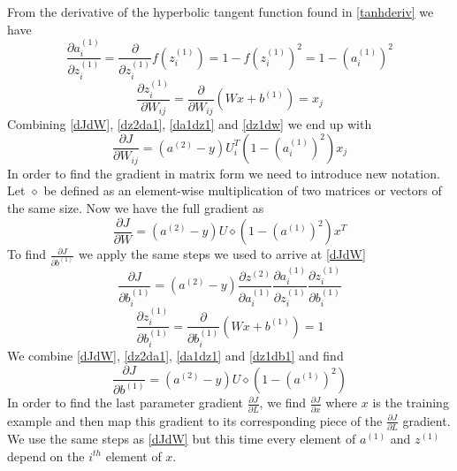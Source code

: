 \documentclass{article}
\begin{document}
From the derivative of the hyperbolic tangent function found in \eqref{tanhderiv} we have
\begin{equation}\label{da1dz1}
\frac{\partial a_{i}^{(1)}}{\partial z_{i}^{(1)}} = \frac{\partial}{\partial z_{i}^{(1)}}f(z_i^{(1)})  = 1-f(z_i^{(1)})^2 = 1-(a_i^{(1)})^2
\end{equation}
\begin{equation}\label{dz1dw}
\frac{\partial z_{i}^{(1)}}{\partial W_{ij}} = \frac{\partial}{\partial W_{ij}} \left( Wx+b^{(1)} \right) = x_j
\end{equation}
Combining \eqref{dJdW}, \eqref{dz2da1}, \eqref{da1dz1} and \eqref{dz1dw} we end up with
\begin{equation}
\frac{\partial J}{\partial W_{ij}} = \left(a^{(2)} - y\right) U^T_{i} \left( 1-(a_i^{(1)})^2 \right) x_j 
\end{equation}
In order to find the gradient in matrix form we need to introduce new notation.  Let \(\diamond \) be defined as an element-wise multiplication of two matrices or vectors of the same size.  Now we have the full gradient as
\begin{equation}\label{djdw}
\frac{\partial J}{\partial W} = \left(a^{(2)} - y\right) U \diamond\left( 1-(a^{(1)})^2 \right) x^T
\end{equation}
To find \(\frac{\partial J}{\partial b^{(1)}}\) we apply the same steps we used to arrive at \eqref{dJdW}
\begin{equation}
\frac{\partial J}{\partial b^{(1)}_{i}} = \left(a^{(2)} - y\right)\frac{\partial z^{(2)}}{\partial a_{i}^{(1)}}\frac{\partial a_{i}^{(1)}}{\partial z_{i}^{(1)}}\frac{\partial z_{i}^{(1)}}{\partial b_{i}^{(1)}}
\end{equation}
\begin{equation}\label{dz1db1}
\frac{\partial z_{i}^{(1)}}{\partial b_{i}^{(1)}} = \frac{\partial}{\partial b^{(1)}_{i}} \left( Wx+b^{(1)} \right) = 1
\end{equation}
We combine \eqref{dJdW}, \eqref{dz2da1}, \eqref{da1dz1} and \eqref{dz1db1} and find
\begin{equation}\label{djdb1}
\frac{\partial J}{\partial b^{(1)}} = \left(a^{(2)} - y\right) U \diamond\left( 1-(a^{(1)})^2 \right)
\end{equation}
In order to find the last parameter gradient \( \frac{\partial J}{\partial L} \), we find \( \frac{\partial J}{\partial x} \) where \(x\) is the training example and then map this gradient to its corresponding piece of the \( \frac{\partial J}{\partial L} \) gradient.  We use the same steps as \eqref{dJdW} but this time every element of \(a^{(1)} \) and \( z^{(1)}\) depend on the \(i^{th}\) element of \(x\).
\end{document}
